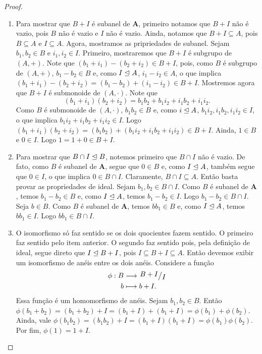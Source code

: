 \begin{proof}
	\begin{enumerate}
	\item Para mostrar que $B+I$ é subanel de $\bm A$, primeiro notamos que $B+I$ não é vazio, pois $B$ não é vazio e $I$ não é vazio. Ainda, notamos que $B+I \subseteq A$, pois $B \subseteq A$ e $I \subseteq A$. Agora, mostramos as pripriedades de subanel. Sejam $b_1,b_2 \in B$ e $i_1,i_2 \in I$. Primeiro, mostraremos que $B+I$ é subgrupo de $(A,+)$. Note que $(b_1+i_1)-(b_2+i_2) \in B+I$, pois, como $B$ é subgrupo de $(A,+)$, $b_1-b_2 \in B$ e, como $I \mathrel{\unlhd} A$, $i_1-i_2 \in A$, o que implica $(b_1+i_1)-(b_2+i_2) = (b_1-b_2)+(i_1-i_2) \in B+I$. Mostremos agora que $B+I$ é submonoide de $(A,\cdot)$. Note que
	\begin{equation*}
	(b_1+i_1)(b_2+i_2)=b_1b_2+b_1i_2+i_1b_2+i_1i_2.
	\end{equation*}
Como $B$ é submonoide de $(A,\cdot)$, $b_1b_2 \in B$ e, como $i \mathrel{\unlhd} A$, $b_1i_2,i_1b_2,i_1i_2 \in I$, o que implica $b_1i_2+i_1b_2+i_1i_2 \in I$. Logo $(b_1+i_1)(b_2+i_2)=(b_1b_2)+(b_1i_2+i_1b_2+i_1i_2) \in B+I$. Ainda, $1 \in B$ e $0 \in I$. Logo $1=1+0 \in B+I$.
	\item Para mostrar que $B \cap I \mathrel{\unlhd} B$, notemos primeiro que $B \cap I$ não é vazio. De fato, como $B$ é subanel de $\bm A$, segue que $0 \in B$ e, como $I \mathrel{\unlhd} A$, também segue que $0 \in I$, o que implica $0 \in B \cap I$. Claramente, $B \cap I \subseteq A$. Então basta provar as propriedades de ideal. Sejam $b_1,b_2 \in B \cap I$. Como $B$ é subanel de $\bm A$, temos $b_1-b_2 \in B$ e, como $I \mathrel{\unlhd} A$, temos $b_1-b_2 \in I$. Logo $b_1-b_2 \in B \cap I$. Seja $b \in B$. Como $B$ é subanel de $\bm A$, temos $bb_1 \in B$ e, como $I \mathrel{\unlhd} A$, temos $bb_1 \in I$. Logo $bb_1 \in B \cap I$.
	\item O isomorfismo só faz sentido se os dois quocientes fazem sentido. O primeiro faz sentido pelo item anterior. O segundo faz sentido pois, pela definição de ideal, segue direto que $I \mathrel{\unlhd} B+I$, pois $I \subseteq B+I \subseteq A$.
	Então devemos exibir um isomorfismo de anéis entre os dois anéis. Considere a função
	\begin{align*}
	\func{\phi}{B}{\quo{B+I}{I}}{b}{b+I.}
	\end{align*}
Essa função é um homomorfismo de anéis. Sejam $b_1,b_2 \in B$. Então $\phi(b_1+b_2)=(b_1+b_2)+I=(b_1+I)+(b_1+I)=\phi(b_1)+\phi(b_2)$. Ainda, vale $\phi(b_1b_2)=(b_1b_2)+I=(b_1+I)(b_1+I)=\phi(b_1)\phi(b_2)$. Por fim, $\phi(1)=1+I$.


\end{enumerate}
\end{proof}
